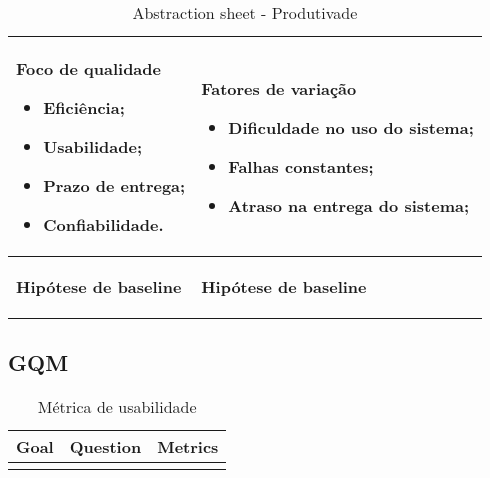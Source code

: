 \begin{table}[H]
\centering
\begin{tabular}{|p{4cm}|p{4cm}|}
\hline
	\begin{center}
	\textbf{Foco de qualidade}
	\end{center}

	\begin{itemize}
		\item{Eficiência;}
		\item{Usabilidade;}
		\item{Prazo de entrega;}
		\item{Confiabilidade.}
	\end{itemize}

	&

	\begin{center}
	\textbf{Fatores de variação}
	\end{center}

	\begin{itemize}
		\item{Dificuldade no uso do sistema;}
		\item{Falhas constantes;}
		\item{Atraso na entrega do sistema;}
	\end{itemize}

	\\ \hline
	\begin{center}
	\textbf{Hipótese de baseline}
	\end{center}

	&

	\begin{center}
	\textbf{Hipótese de baseline}
	\end{center}

	\\ \hline
\end{tabular}
\caption{Abstraction sheet - Produtivade}
\label{tab:produtividade_sheet}
\end{table}

\subsection{GQM}


\begin{table}[H]
\centering
\begin{tabular}{|c|c|c|}
\hline
	\textbf{Goal} &
  \textbf{Question} &
  \textbf{Metrics}
	\\ \hline
	 &
   &

	\\ \hline
\end{tabular}
\caption{Métrica de usabilidade}
\label{tab:métrica_de_usabilidade}
\end{table}

